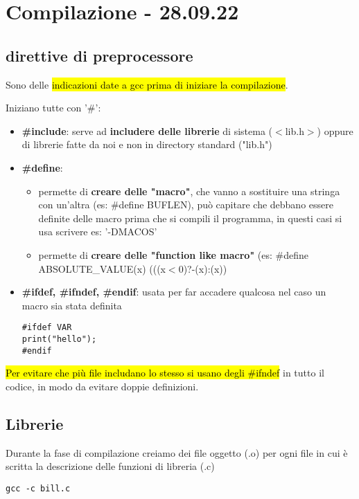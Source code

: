 \section{Compilazione - 28.09.22}

\subsection{direttive di preprocessore}
Sono delle \hl{indicazioni date a gcc prima di iniziare la compilazione}.

Iniziano tutte con '#':
\begin{itemize}
	\item \textbf{#include}: serve ad \textbf{includere delle librerie} di sistema ($<$lib.h$>$) oppure di librerie fatte da noi e non in directory standard ("lib.h")
	\item \textbf{#define}:
		\begin{itemize}
			\item permette di \textbf{creare delle "macro"}, che vanno a sostituire una stringa con un'altra (es: #define BUFLEN), può capitare che debbano essere definite delle macro prima che si compili il programma, in questi casi si usa scrivere es: '-DMACOS'
			\item permette di \textbf{creare delle "function like macro"} (es: #define ABSOLUTE\_VALUE(x) (((x$<$0)?-(x):(x))  
		\end{itemize}
		
	\item \textbf{#ifdef, #ifndef, #endif}: usata per far accadere qualcosa nel caso un macro sia stata definita
\begin{lstlisting}
#ifdef VAR
print("hello");
#endif
\end{lstlisting}

\end{itemize} 

\hl{Per evitare che più file includano lo stesso si usano degli #ifndef} in tutto il codice, in modo da evitare doppie definizioni.


\subsection{Librerie}

Durante la fase di compilazione creiamo dei file oggetto (.o) per ogni file in cui è scritta la descrizione delle funzioni di libreria (.c)

\begin{lstlisting}
gcc -c bill.c
\end{lstlisting}

